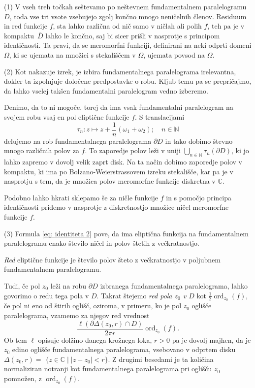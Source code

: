 \documentclass[mat1]{fmfdelo}
\numberwithin{equation}{section}
\newcommand{\N}{\mathbb N}
\newcommand{\C}{\mathbb C}
\newcommand{\om}{\omega}
\newcommand{\ord}[2]{\operatorname{ord}_{#1}(#2)}
\newcommand{\olsi}[1]{\,\overline{\!{#1}}} %
\theoremstyle{definition}
\begin{document}
\begin{opomba}
    \label{liouville opomba}

    (1) V vseh treh točkah seštevamo po neštevnem fundamentalnem paralelogramu $D$, toda vse tri vsote vsebujejo zgolj končno mnogo neničelnih členov. Residuum in red funkcije $f$, sta lahko različna od nič samo v ničlah ali polih $f$, teh pa je v kompaktu $\olsi{D}$ lahko le končno, saj bi sicer prišli v nasprotje s principom identičnosti. Ta pravi, da se meromorfni funkciji, definirani na neki odprti domeni $\Omega$, ki se ujemata na množici s stekališčem v $\Omega$, ujemata povsod na $\Omega$.
     
    (2) Kot nakazuje izrek, je izbira fundamentalnega paralelograma irelevantna, dokler ta izpolnjuje določene predpostavke o robu. Kljub temu pa se prepričajmo, da lahko vselej takšen fundamentalni paralelogram vedno izberemo. 

    Denimo, da to ni mogoče, torej da ima vsak fundamentalni paralelogram na svojem robu vsaj en pol eliptične funkcije $f$. S translacijami
    \[
        \tau_n : z \mapsto z + \frac{1}{n}(\om_1 + \om_2); \quad n\in \N
    \]
    delujemo na rob fundamentalnega paralelograma $\partial D$ in tako dobimo števno mnogo različnih polov za $f$. To zaporedje polov leži v uniji $\bigcup_{n \in \N} \tau_n(\partial D)$, ki jo lahko zapremo v dovolj velik zaprt disk. Na ta način dobimo zaporedje polov v kompaktu, ki ima po Bolzano-Weierstrassovem izreku stekališče, kar pa je v nasprotju s tem, da je množica polov meromorfne funkcije diskretna v $\C$. 
    
    Podobno lahko hkrati sklepamo še za ničle funkcije $f$ in s pomočjo principa identičnosti pridemo v nasprotje z diskretnostjo množice ničel meromorfne funkcije $f$.
    
    (3) Formula \eqref{eq: identiteta 2} pove, da ima eliptična funkcija na fundamentalnem paralelogramu enako število ničel in polov štetih z večkratnostjo. 

\end{opomba}

\begin{definicija}
    \emph{Red} eliptične funkcije je število polov šteto z večkratnostjo v poljubnem fundamentalnem paralelogramu. 
\end{definicija}

Tudi, če pol $z_0$ leži na robu $\partial D$ izbranega fundamentalnega paralelograma, lahko govorimo o redu tega pola v $D$. Takrat štejemo \emph{red pola $z_0$ v $D$} kot $\frac{1}{2}\ord{z_0}{f}$, če pol ni eno od štirih oglišč, oziroma, v primeru, ko je pol $z_0$ oglišče paralelograma, vzamemo za njegov red vrednost
\[
    \frac{\ell(\partial \Delta(z_0, r) \cap D)}{2 \pi r}\ord{z_0}{f}.
\]
Ob tem $\ell$ opisuje dolžino danega krožnega loka, $r > 0$ pa je dovolj majhen, da je $z_0$ edino oglišče fundamentalnega paralelograma, vsebovano v odprtem disku ${\Delta(z_0, r) =}$ ${\{z \in \C \mid \left\lvert z - z_0 \right\rvert < r\}}$. Z drugimi besedami je ta količina normaliziran notranji kot fundamentalnega paralelograma pri oglišču $z_0$ pomnožen, z $\ord{z_0}{f}$.  
\end{document}
